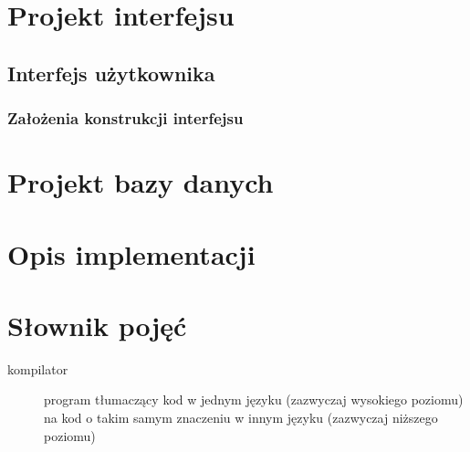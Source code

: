 \section{Projekt interfejsu}

\subsection{Interfejs użytkownika}


\subsubsection{Założenia konstrukcji interfejsu}




\section{Projekt bazy danych}



\section{Opis implementacji}


\section{Słownik pojęć}

\begin{description}
    \item[kompilator] program tłumaczący kod w jednym języku (zazwyczaj wysokiego poziomu) na kod o takim
        samym znaczeniu w innym języku (zazwyczaj niższego poziomu)
\end{description}
